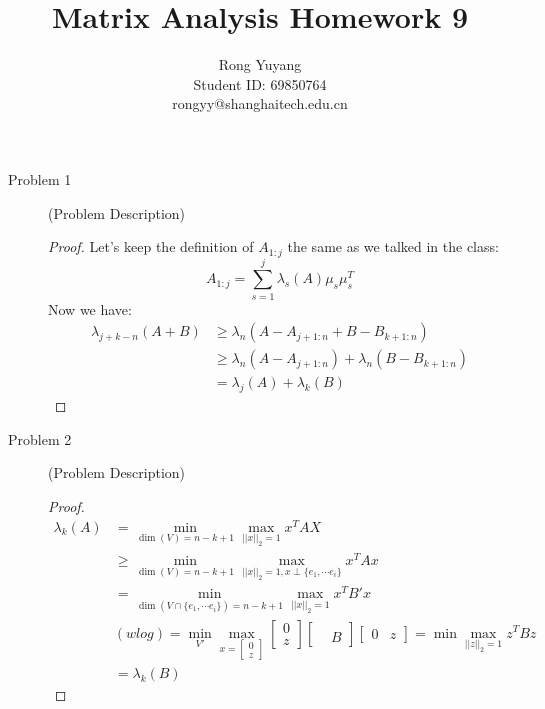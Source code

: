 \documentclass{article}
\title{Matrix Analysis Homework 9}
\author{Rong Yuyang \\ Student ID: 69850764 \\ rongyy@shanghaitech.edu.cn}
\begin{document}
\maketitle

\begin{description}
	\item[Problem 1] (Problem Description)
	\begin{proof}
		Let's keep the definition of $A_{1:j}$ the same as we talked in the class:
		$$ A_{1:j} = \sum_{s = 1}^{j}\lambda_s(A)\mu_s\mu_s^T$$
		Now we have:
		\begin{equation}\begin{aligned}
			\lambda_{j+k-n}(A+B)
			& \geq \lambda_{n}(A-A_{j+1:n} + B-B_{k+1:n}) \\
			& \geq \lambda_{n}(A-A_{j+1:n}) + \lambda_{n}(B-B_{k+1:n}) \\
			&   =  \lambda_{j}(A) + \lambda_{k}(B)
		\end{aligned}\end{equation}
	\end{proof}

	\item[Problem 2] (Problem Description)
	\begin{proof}
		\begin{equation}\begin{aligned}
			\lambda_k(A)
			& = \min_{\dim(V) = n-k+1} \max_{||x||_2 =1} x^TAX  \\
			& \geq \min_{\dim(V) = n-k+1} \max_{||x||_2 = 1, x \perp \{e_{1}, \cdots e_{i}\}} x^TAx \\
			& = \min_{\dim(V\cap\{e_{1}, \cdots e_{i}\}) = n-k+1} \max_{||x||_2 = 1} x^TB'x \\
			& (wlog) = \min_{V'} \max_{x = \begin{bmatrix}0 \\ z\end{bmatrix}} \begin{bmatrix}0 \\ z\end{bmatrix}\begin{bmatrix} &  \\  & B\end{bmatrix}\begin{bmatrix}0 & z\end{bmatrix}
			= \min \max_{||z||_2 = 1} z^TBz \\
			& = \lambda_k(B)
		\end{aligned}\end{equation}
	\end{proof}


\end{description}
\end{document}
